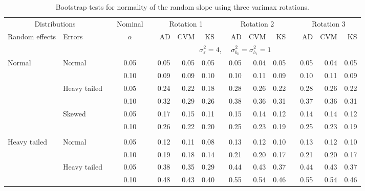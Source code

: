 \documentclass{article} %
\begin{document}
\begin{table}[ht]
\begin{scriptsize}
\begin{center}
\begin{tabular}{ll p{.1cm} c p{.1cm} rrr p{.1cm} rrr p{.1cm} rrr}
   \hline
\end{tabular}
\end{center}
\end{scriptsize}
\end{table}

\begin{table}[ht]
\caption{Bootstrap tests for normality of the random slope using three varimax rotations.}
\begin{scriptsize}
\begin{center}
\begin{tabular}{ll p{.1cm} c p{.1cm} rrr p{.1cm} rrr p{.1cm} rrr}
  \hline
  \multicolumn{2}{c}{Distributions}& & Nominal & &  \multicolumn{3}{c}{Rotation 1} & & \multicolumn{3}{c}{Rotation 2} & & \multicolumn{3}{c}{Rotation 3}\\ \cline{1-2} \cline{6-8} \cline{10-12} \cline{14-16}
  Random effects & Errors & & $\alpha$ & & AD & CVM & KS & & AD & CVM & KS & & AD & CVM & KS \\ 
   \hline
& && && \multicolumn{9}{c}{$\sigma_{\varepsilon}^2 = 4$, \ \ $\sigma_{b_0}^2 = \sigma_{b_1}^2 = 1$} \\ \cline{6-16}
Normal       & Normal       && 0.05 &&   0.05 & 0.05 & 0.05 && 0.05 & 0.04 & 0.05 && 0.05 & 0.04 & 0.05 \\ 
             &              && 0.10 &&   0.09 & 0.09 & 0.10 && 0.10 & 0.11 & 0.09 && 0.10 & 0.11 & 0.09 \\ 
             & Heavy tailed && 0.05 &&   0.24 & 0.22 & 0.18 && 0.28 & 0.26 & 0.22 && 0.28 & 0.26 & 0.22 \\ 
             &              && 0.10 &&   0.32 & 0.29 & 0.26 && 0.38 & 0.36 & 0.31 && 0.37 & 0.36 & 0.31 \\ 
             & Skewed       && 0.05 &&   0.17 & 0.15 & 0.11 && 0.15 & 0.14 & 0.12 && 0.14 & 0.14 & 0.12 \\ 
             &              && 0.10 &&   0.26 & 0.22 & 0.20 && 0.25 & 0.23 & 0.19 && 0.25 & 0.23 & 0.19 \\ 
             &&&&&&&&&&&&&&&\\
Heavy tailed & Normal       && 0.05 &&   0.12 & 0.11 & 0.08 && 0.13 & 0.12 & 0.10 && 0.13 & 0.12 & 0.10 \\ 
             &              && 0.10 &&   0.19 & 0.18 & 0.14 && 0.21 & 0.20 & 0.17 && 0.21 & 0.20 & 0.17 \\ 
             & Heavy tailed && 0.05 &&   0.38 & 0.35 & 0.29 && 0.44 & 0.43 & 0.37 && 0.44 & 0.43 & 0.37 \\ 
             &              && 0.10 &&   0.48 & 0.43 & 0.40 && 0.55 & 0.54 & 0.46 && 0.55 & 0.54 & 0.46 \\ 

\end{tabular}
\end{center}
\end{scriptsize}
\end{table}
\end{document}
